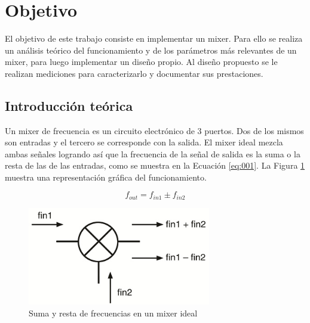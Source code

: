 \documentclass[a4paper,10pt]{article}
\title{  }
\begin{document}
	\maketitle %
	\newpage

	\tableofcontents %
	\newpage


\section{Objetivo}
\indent El objetivo de este trabajo consiste en implementar un mixer. Para ello se realiza un an\'alisis te\'orico del funcionamiento y de los par\'ametros m\'as relevantes de un mixer, para luego implementar un dise\~no propio. Al dise\~no propuesto se le realizan  mediciones para caracterizarlo y documentar sus prestaciones.

\newpage
\subsection{Introducción teórica}
	\indent Un mixer de frecuencia es un circuito electrónico de 3 puertos. Dos
	de los mismos son entradas y el tercero se corresponde con la salida. El mixer ideal mezcla 
	ambas señales logrando así que la frecuencia de la señal de salida es la 
	suma o la resta de las de las entradas, como se muestra en la Ecuación 
	\ref{eq:001}. La Figura \ref{img:001} muestra una representación gráfica del
	funcionamiento.
	
	\begin{equation}\label{eq:001}
		f_{out} = f_{in1} \pm f_{in2}
	\end{equation}

	\begin{figure}[!htb]
		\centering
		\includegraphics[width=8cm]
		{Images/qmetro1.png}
		\caption{Suma y resta de frecuencias en un mixer ideal}
		\label{img:001} 
	\end{figure}
\end{document}
